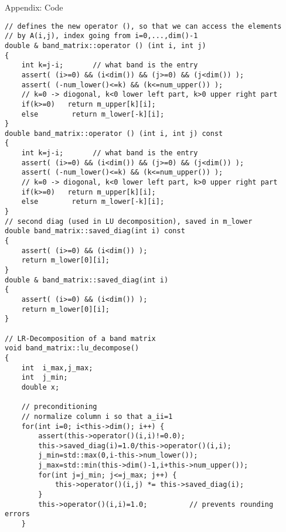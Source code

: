 \documentclass[letterpaper,12pt]{article}
\begin{document}
\begin{section}{Appendix: Code}
\begin{lstlisting}
// defines the new operator (), so that we can access the elements
// by A(i,j), index going from i=0,...,dim()-1
double & band_matrix::operator () (int i, int j)
{
    int k=j-i;       // what band is the entry
    assert( (i>=0) && (i<dim()) && (j>=0) && (j<dim()) );
    assert( (-num_lower()<=k) && (k<=num_upper()) );
    // k=0 -> diogonal, k<0 lower left part, k>0 upper right part
    if(k>=0)   return m_upper[k][i];
    else	    return m_lower[-k][i];
}
double band_matrix::operator () (int i, int j) const
{
    int k=j-i;       // what band is the entry
    assert( (i>=0) && (i<dim()) && (j>=0) && (j<dim()) );
    assert( (-num_lower()<=k) && (k<=num_upper()) );
    // k=0 -> diogonal, k<0 lower left part, k>0 upper right part
    if(k>=0)   return m_upper[k][i];
    else	    return m_lower[-k][i];
}
// second diag (used in LU decomposition), saved in m_lower
double band_matrix::saved_diag(int i) const
{
    assert( (i>=0) && (i<dim()) );
    return m_lower[0][i];
}
double & band_matrix::saved_diag(int i)
{
    assert( (i>=0) && (i<dim()) );
    return m_lower[0][i];
}

// LR-Decomposition of a band matrix
void band_matrix::lu_decompose()
{
    int  i_max,j_max;
    int  j_min;
    double x;

    // preconditioning
    // normalize column i so that a_ii=1
    for(int i=0; i<this->dim(); i++) {
        assert(this->operator()(i,i)!=0.0);
        this->saved_diag(i)=1.0/this->operator()(i,i);
        j_min=std::max(0,i-this->num_lower());
        j_max=std::min(this->dim()-1,i+this->num_upper());
        for(int j=j_min; j<=j_max; j++) {
            this->operator()(i,j) *= this->saved_diag(i);
        }
        this->operator()(i,i)=1.0;          // prevents rounding errors
    }


\end{lstlisting}
\end{section}
\end{document}
